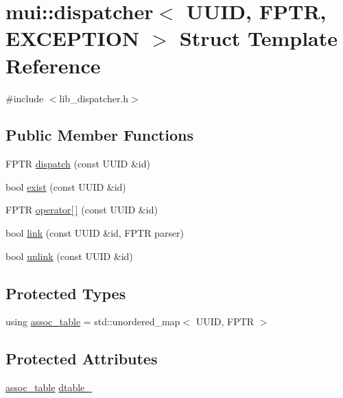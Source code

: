 \hypertarget{structmui_1_1dispatcher}{}\section{mui\+:\+:dispatcher$<$ U\+U\+ID, F\+P\+TR, E\+X\+C\+E\+P\+T\+I\+ON $>$ Struct Template Reference}
\label{structmui_1_1dispatcher}


{\ttfamily \#include $<$lib\+\_\+dispatcher.\+h$>$}

\subsection*{Public Member Functions}
\begin{DoxyCompactItemize}
\item 
F\+P\+TR \hyperlink{structmui_1_1dispatcher_a725b23518b180b3738df48bbd4bee228}{dispatch} (const U\+U\+ID \&id)
\item 
bool \hyperlink{structmui_1_1dispatcher_a2286f91611ef194b2b4f3565257b4e4a}{exist} (const U\+U\+ID \&id)
\item 
F\+P\+TR \hyperlink{structmui_1_1dispatcher_a03dcca40c263e4d309e37b1b210f98d6}{operator\mbox{[}$\,$\mbox{]}} (const U\+U\+ID \&id)
\item 
bool \hyperlink{structmui_1_1dispatcher_ab43f6dd70225423fb101c0c254a3b267}{link} (const U\+U\+ID \&id, F\+P\+TR parser)
\item 
bool \hyperlink{structmui_1_1dispatcher_a54874aeadc1dee3647e4196ee843c87d}{unlink} (const U\+U\+ID \&id)
\end{DoxyCompactItemize}
\subsection*{Protected Types}
\begin{DoxyCompactItemize}
\item 
using \hyperlink{structmui_1_1dispatcher_a14156fe55b0a25c899dd521c2b9d5508}{assoc\+\_\+table} = std\+::unordered\+\_\+map$<$ U\+U\+ID, F\+P\+TR $>$
\end{DoxyCompactItemize}
\subsection*{Protected Attributes}
\begin{DoxyCompactItemize}
\item 
\hyperlink{structmui_1_1dispatcher_a14156fe55b0a25c899dd521c2b9d5508}{assoc\+\_\+table} \hyperlink{structmui_1_1dispatcher_a601bd43f740243c9acd74299799bfbbe}{dtable\+\_\+}
\end{DoxyCompactItemize}



